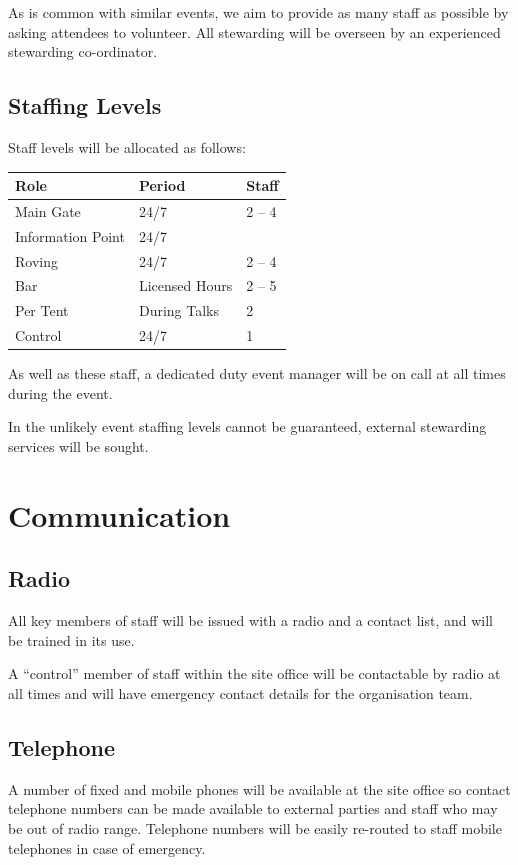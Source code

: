 As is common with similar events, we aim to provide as many staff as possible
by asking attendees to volunteer. All stewarding will be overseen by an
experienced stewarding co-ordinator.

\subsection{Staffing Levels}

Staff levels will be allocated as follows:

\begin{tabular}{l l l}
Role & Period & Staff \\
\hline
Main Gate & 24/7 & 2 -- 4 \\
Information Point & 24/7 & \\
Roving & 24/7 & 2 -- 4 \\
Bar & Licensed Hours & 2 -- 5 \\
Per Tent & During Talks & 2 \\
Control & 24/7 & 1
\end{tabular}

As well as these staff, a dedicated duty event manager will be on call at all times during the event.

In the unlikely event staffing levels cannot be guaranteed, external stewarding services will be sought.

\section{Communication}

\subsection{Radio}
All key members of staff will be issued with a radio and a contact list, and
will be trained in its use.

A ``control'' member of staff within the site office will be contactable by
radio at all times and will have emergency contact details for the organisation
team.

\subsection{Telephone}
A number of fixed and mobile phones will be available at the site office so
contact telephone numbers can be made available to external parties and staff
who may be out of radio range. Telephone numbers will be easily re-routed to
staff mobile telephones in case of emergency.

